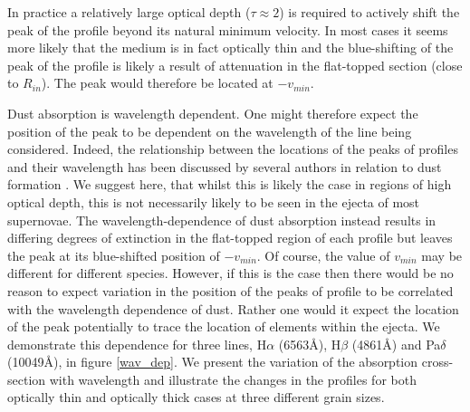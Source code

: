 \documentclass[useAMS,usenatbib,usegraphicx]{mnras}
\begin{document}
In practice a relatively large optical depth ($\tau \approx 2$) is required to actively shift the peak of the profile beyond its natural minimum velocity.  In most cases it seems more likely that the medium is in fact optically thin and the blue-shifting of the peak of the profile is likely a result of attenuation in the flat-topped section (close to $R_{in}$).  The peak would therefore be located at $-v_{min}$.  

Dust absorption is wavelength dependent.  One might therefore expect the position of the peak to be dependent on the wavelength of the line being considered.  Indeed, the relationship between the locations of the peaks of profiles and their wavelength has been discussed by several authors in relation to dust formation \citep{Gall2014,Fransson2013,Smith2012}.  We suggest here, that whilst this is likely the case in regions of high optical depth, this is not necessarily likely to be seen in the ejecta of most supernovae.  The wavelength-dependence of dust absorption instead results in differing degrees of extinction in the flat-topped region of each profile but leaves the peak at its blue-shifted position of $-v_{min}$.  Of course, the value of $v_{min}$ may be different for different species.  However, if this is the case then there would be no reason to expect variation in the position of the peaks of profile to be correlated with the wavelength dependence of dust.  Rather one would it expect the location of the peak potentially to trace the location of elements within the ejecta. We demonstrate this dependence for three lines, H$\alpha$ (6563\AA), H$\beta$ (4861\AA) and Pa$\delta$ (10049\AA), in figure \ref{wav_dep}.  We present the variation of the absorption cross-section with wavelength and illustrate the changes in the profiles for both optically thin and optically thick cases at three different grain sizes.
\end{document}
